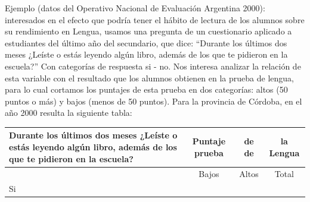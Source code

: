 \documentclass[]{book}
\begin{document}
Ejemplo (datos del Operativo Nacional de Evaluación Argentina 2000): interesados en el efecto que podría tener el hábito de lectura de los alumnos sobre su rendimiento en Lengua, usamos una pregunta de un cuestionario aplicado a estudiantes del último año del secundario, que dice: ``Durante los últimos dos meses ¿Leíste o estás leyendo algún libro, además de los que te pidieron en la escuela?'' Con categorías de respuesta si - no. Nos interesa analizar la relación de esta variable con el resultado que los alumnos obtienen en la prueba de lengua, para lo cual cortamos los puntajes de esta prueba en dos categorías: altos (50 puntos o más) y bajos (menos de 50 puntos). Para la provincia de Córdoba, en el año 2000 resulta la siguiente tabla:

\begin{longtable}[]{@{}lccc@{}}
\toprule
\begin{minipage}[b]{0.68\columnwidth}\raggedright
Durante los últimos dos meses ¿Leíste o estás leyendo algún libro, además de los que te pidieron en la escuela?\strut
\end{minipage} & \begin{minipage}[b]{0.10\columnwidth}\centering
Puntaje prueba\strut
\end{minipage} & \begin{minipage}[b]{0.04\columnwidth}\centering
de de\strut
\end{minipage} & \begin{minipage}[b]{0.07\columnwidth}\centering
la Lengua\strut
\end{minipage}\tabularnewline
\midrule
\endhead
\begin{minipage}[t]{0.68\columnwidth}\raggedright
\strut
\end{minipage} & \begin{minipage}[t]{0.10\columnwidth}\centering
Bajos\strut
\end{minipage} & \begin{minipage}[t]{0.04\columnwidth}\centering
Altos\strut
\end{minipage} & \begin{minipage}[t]{0.07\columnwidth}\centering
Total\strut
\end{minipage}\tabularnewline
\begin{minipage}[t]{0.68\columnwidth}\raggedright
Si\strut
\end{minipage} & \begin{minipage}[t]{0.10\columnwidth}\centering
2382\strut
\end{minipage} & \begin{minipage}[t]{0.04\columnwidth}\centering

\end{minipage}
\end{longtable}
\end{document}
